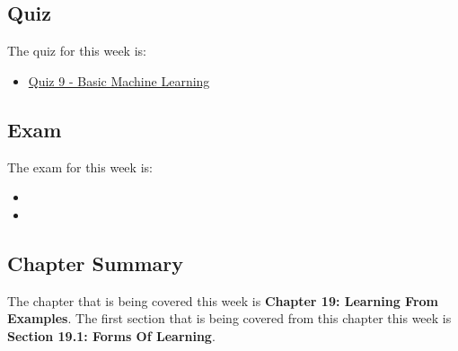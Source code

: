 \subsection{Quiz}

The quiz for this week is:

\begin{itemize}
    \item \href{https://applied.cs.colorado.edu/mod/quiz/view.php?id=60014}{Quiz 9 - Basic Machine Learning}
\end{itemize}

\subsection{Exam}

The exam for this week is:

\begin{itemize}
    \item {}
    \item {}
\end{itemize}

\newpage

\subsection{Chapter Summary}

The chapter that is being covered this week is \textbf{Chapter 19: Learning From Examples}. The first section that is being covered from this chapter this week is \textbf{Section 19.1: Forms Of Learning}.

